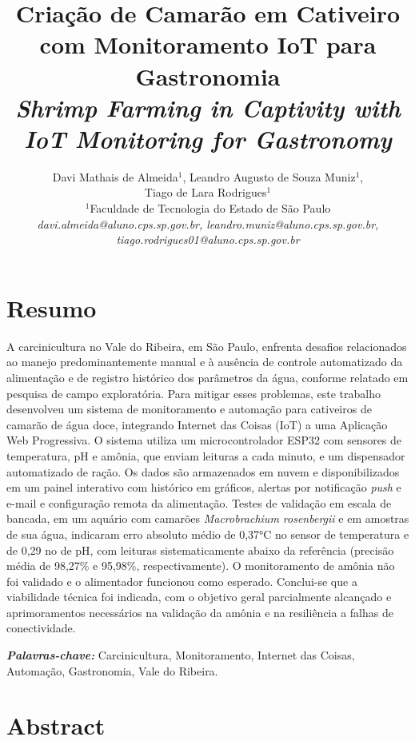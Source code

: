 \documentclass[11pt,a4paper]{article}
\title{\vspace{0.6cm}\textbf{\large Criação de Camarão em Cativeiro com Monitoramento IoT para Gastronomia} \\[0.2cm]
\large \textit{Shrimp Farming in Captivity with IoT Monitoring for Gastronomy}}
\author{
    Davi Mathais de Almeida$^{1}$, Leandro Augusto de Souza Muniz$^{1}$, \\
    Tiago de Lara Rodrigues$^{1}$ \\[0.3cm]
    \small
    $^{1}$Faculdade de Tecnologia do Estado de São Paulo \\
    \textit{davi.almeida@aluno.cps.sp.gov.br, leandro.muniz@aluno.cps.sp.gov.br,} \\
    \textit{tiago.rodrigues01@aluno.cps.sp.gov.br}
}
\date{}
\begin{document}
\pagestyle{fancy}

\maketitle
\thispagestyle{fancy}

\section*{Resumo}

A carcinicultura no Vale do Ribeira, em São Paulo, enfrenta desafios relacionados ao manejo predominantemente manual e à ausência de controle automatizado da alimentação e de registro histórico dos parâmetros da água, conforme relatado em pesquisa de campo exploratória. Para mitigar esses problemas, este trabalho desenvolveu um sistema de monitoramento e automação para cativeiros de camarão de água doce, integrando Internet das Coisas (IoT) a uma Aplicação Web Progressiva. O sistema utiliza um microcontrolador ESP32 com sensores de temperatura, pH e amônia, que enviam leituras a cada minuto, e um dispensador automatizado de ração. Os dados são armazenados em nuvem e disponibilizados em um painel interativo com histórico em gráficos, alertas por notificação \textit{push} e e-mail e configuração remota da alimentação. Testes de validação em escala de bancada, em um aquário com camarões \textit{Macrobrachium rosenbergii} e em amostras de sua água, indicaram erro absoluto médio de 0,37°C no sensor de temperatura e de 0,29 no de pH, com leituras sistematicamente abaixo da referência (precisão média de 98,27\% e 95,98\%, respectivamente). O monitoramento de amônia não foi validado e o alimentador funcionou como esperado. Conclui-se que a viabilidade técnica foi indicada, com o objetivo geral parcialmente alcançado e aprimoramentos necessários na validação da amônia e na resiliência a falhas de conectividade.

\vspace{0.3cm}
\noindent\textit{\textbf{Palavras-chave:}} Carcinicultura, Monitoramento, Internet das Coisas, Automação, Gastronomia, Vale do Ribeira.

\section*{Abstract}
\end{document}

